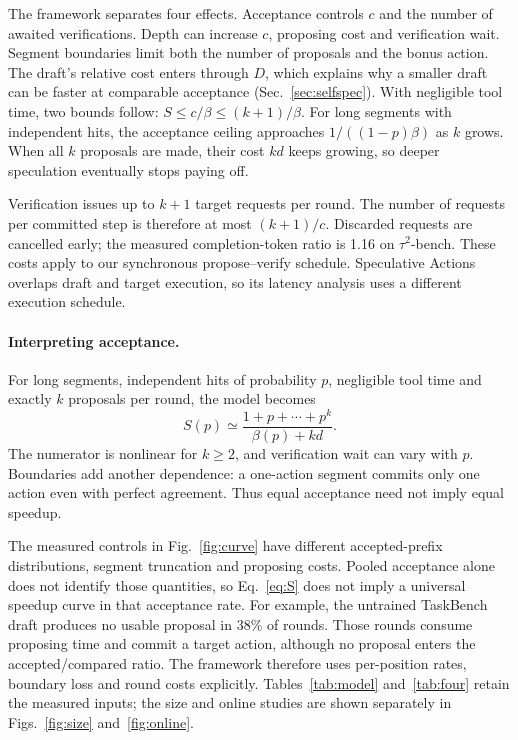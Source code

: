 The framework separates four effects. Acceptance controls $c$ and the number of awaited
verifications. Depth can increase $c$, proposing cost and verification wait. Segment boundaries
limit both the number of proposals and the bonus action. The draft's relative cost enters through
$D$, which explains why a smaller draft can be faster at comparable acceptance
(Sec.~\ref{sec:selfspec}). With negligible tool time, two bounds follow:
$S\le c/\beta\le(k+1)/\beta$. For long segments with independent hits, the acceptance ceiling
approaches $1/((1-p)\beta)$ as $k$ grows. When all $k$ proposals are made, their cost $kd$ keeps
growing, so deeper speculation eventually stops paying off.

Verification issues up to $k+1$ target requests per round. The number of requests per committed
step is therefore at most $(k+1)/c$. Discarded requests are cancelled early; the measured completion-token
ratio is 1.16 on $\tau^2$-bench. These costs apply to our synchronous propose--verify schedule.
Speculative Actions~\citep{specactions} overlaps draft and target execution, so its latency analysis
uses a different execution schedule.

\paragraph{Interpreting acceptance.}
For long segments, independent hits of probability $p$, negligible tool time and exactly $k$
proposals per round, the model becomes
\begin{equation}
 S(p)\simeq\frac{1+p+\cdots+p^k}{\beta(p)+kd}.
 \label{eq:main:acceptance}
\end{equation}
The numerator is nonlinear for $k\ge2$, and verification wait can vary with $p$. Boundaries add
another dependence: a one-action segment commits only one action even with perfect agreement.
Thus equal acceptance need not imply equal speedup.

The measured controls in Fig.~\ref{fig:curve} have different accepted-prefix distributions,
segment truncation and proposing costs. Pooled acceptance alone does not identify those quantities,
so Eq.~\ref{eq:S} does not imply a universal speedup curve in that acceptance rate.
For example, the untrained TaskBench draft produces no usable proposal in 38\% of rounds. Those
rounds consume proposing time and commit a target action, although no proposal enters the
accepted/compared ratio. The framework therefore uses per-position rates, boundary loss and
round costs explicitly. Tables~\ref{tab:model} and~\ref{tab:four} retain the measured inputs;
the size and online studies are shown separately in Figs.~\ref{fig:size} and~\ref{fig:online}.

